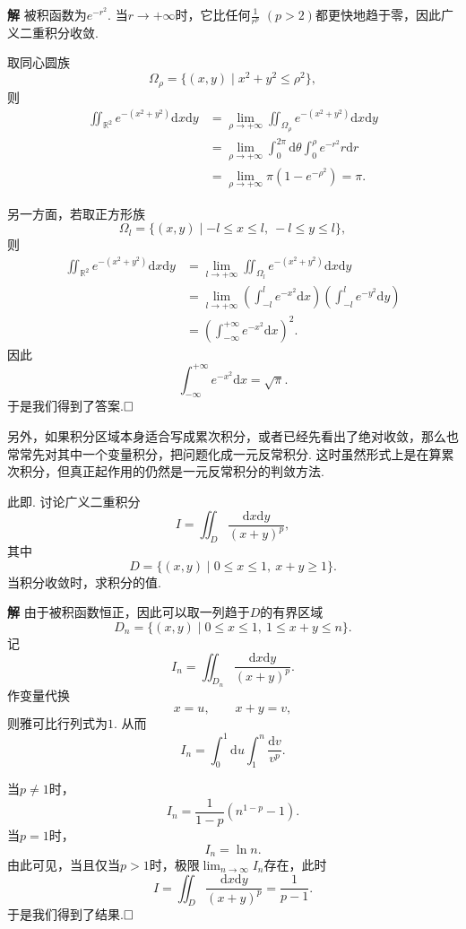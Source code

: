 \documentclass{ctexart}
\newenvironment{custom}[1]{\par\noindent \textbf{#1}\quad}{\par\vspace{1em}}
\begin{document}
\begin{custom}{解}
被积函数为$e^{-r^{2}}$. 当$r\to+\infty$时，它比任何$\frac{1}{r^{p}}$ $(p>2)$都更快地趋于零，因此广义二重积分收敛.

取同心圆族
$$\Omega_{\rho}=\{(x,y)\mid x^{2}+y^{2}\leqslant \rho^{2}\},$$
则
$$\begin{aligned}
\iint_{\mathbb{R}^{2}}{e^{-(x^{2}+y^{2})}\mathrm{d}x\mathrm{d}y}
&=\lim_{\rho\to+\infty}\iint_{\Omega_{\rho}}{e^{-(x^{2}+y^{2})}\mathrm{d}x\mathrm{d}y}\\
&=\lim_{\rho\to+\infty}\int_{0}^{2\pi}{\mathrm{d}\theta\int_{0}^{\rho}{e^{-r^{2}}r\mathrm{d}r}}\\
&=\lim_{\rho\to+\infty}\pi(1-e^{-\rho^{2}})=\pi.
\end{aligned}$$

另一方面，若取正方形族
$$\Omega_{l}=\{(x,y)\mid -l\leqslant x\leqslant l,\ -l\leqslant y\leqslant l\},$$
则
$$\begin{aligned}
\iint_{\mathbb{R}^{2}}{e^{-(x^{2}+y^{2})}\mathrm{d}x\mathrm{d}y}
&=\lim_{l\to+\infty}\iint_{\Omega_{l}}{e^{-(x^{2}+y^{2})}\mathrm{d}x\mathrm{d}y}\\
&=\lim_{l\to+\infty}\left(\int_{-l}^{l}{e^{-x^{2}}\mathrm{d}x}\right)\left(\int_{-l}^{l}{e^{-y^{2}}\mathrm{d}y}\right)\\
&=\left(\int_{-\infty}^{+\infty}{e^{-x^{2}}\mathrm{d}x}\right)^{2}.
\end{aligned}$$
因此
$$\int_{-\infty}^{+\infty}{e^{-x^{2}}\mathrm{d}x}=\sqrt{\pi}.$$
于是我们得到了答案.$\hfill{\square}$
\end{custom}


另外，如果积分区域本身适合写成累次积分，或者已经先看出了绝对收敛，那么也常常先对其中一个变量积分，把问题化成一元反常积分. 这时虽然形式上是在算累次积分，但真正起作用的仍然是一元反常积分的判敛方法.

\begin{example}
此即\cite[例题22.4.2]{XHM}. 讨论广义二重积分
$$I=\iint_{D}{\frac{\mathrm{d}x\mathrm{d}y}{(x+y)^{p}}},$$
其中
$$D=\{(x,y)\mid 0\leqslant x\leqslant 1,\ x+y\geqslant 1\}.$$
当积分收敛时，求积分的值.
\end{example}

\begin{custom}{解}
由于被积函数恒正，因此可以取一列趋于$D$的有界区域
$$D_{n}=\{(x,y)\mid 0\leqslant x\leqslant 1,\ 1\leqslant x+y\leqslant n\}.$$
记
$$I_{n}=\iint_{D_{n}}{\frac{\mathrm{d}x\mathrm{d}y}{(x+y)^{p}}}.$$
作变量代换
$$x=u,\qquad x+y=v,$$
则雅可比行列式为$1$. 从而
$$I_{n}=\int_{0}^{1}{\mathrm{d}u\int_{1}^{n}{\frac{\mathrm{d}v}{v^{p}}}}.$$

当$p\neq 1$时，
$$I_{n}=\frac{1}{1-p}(n^{1-p}-1).$$
当$p=1$时，
$$I_{n}=\ln n.$$
由此可见，当且仅当$p>1$时，极限$\lim_{n\to\infty}I_{n}$存在，此时
$$I=\iint_{D}{\frac{\mathrm{d}x\mathrm{d}y}{(x+y)^{p}}}=\frac{1}{p-1}.$$
于是我们得到了结果.$\hfill{\square}$
\end{custom}
\end{document}
